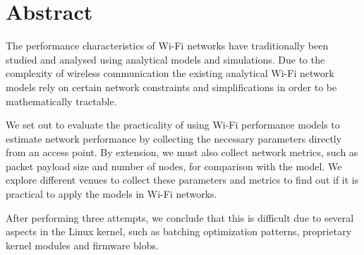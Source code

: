 
\chapter*{Abstract}

The performance characteristics of Wi-Fi networks have traditionally been
studied and analysed using analytical models and simulations. Due to the
complexity of wireless communication the existing analytical Wi-Fi network
models rely on certain network constraints and simplifications in order to be
mathematically tractable.

We set out to evaluate the practicality of using Wi-Fi performance models to 
estimate network performance by collecting the necessary parameters directly
from an access point. By extension, we must also collect network metrics,
such as packet payload size and number of nodes, for comparison with the model. We 
explore different venues to collect these parameters and metrics to find out
if it is practical to apply the models in Wi-Fi networks. 

After performing three attempts, we conclude that this is difficult due to
several aspects in the Linux kernel, such as batching optimization patterns,
proprietary kernel modules and firmware blobs.
